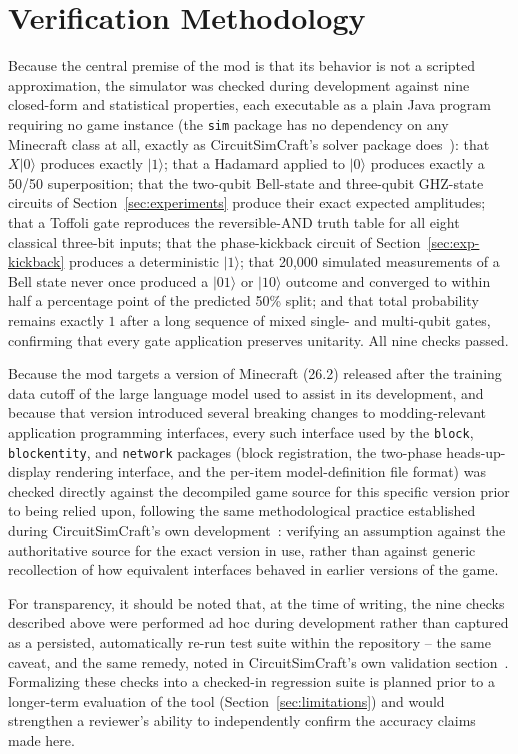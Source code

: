 \section{Verification Methodology}
\label{sec:validation}

Because the central premise of the mod is that its behavior is not a scripted
approximation, the simulator was checked during development against nine closed-form and
statistical properties, each executable as a plain Java program requiring no game instance
(the \texttt{sim} package has no dependency on any Minecraft class at all, exactly as
CircuitSimCraft's solver package does~\cite{picos2026circuitsimcraft}): that $X|0\rangle$ produces
exactly $|1\rangle$; that a Hadamard applied to $|0\rangle$ produces exactly a 50/50
superposition; that the two-qubit Bell-state and three-qubit GHZ-state circuits of
Section~\ref{sec:experiments} produce their exact expected amplitudes; that a Toffoli gate
reproduces the reversible-AND truth table for all eight classical three-bit inputs; that the
phase-kickback circuit of Section~\ref{sec:exp-kickback} produces a deterministic $|1\rangle$;
that 20{,}000 simulated measurements of a Bell state never once produced a $|01\rangle$ or
$|10\rangle$ outcome and converged to within half a percentage point of the predicted 50\%
split; and that total probability remains exactly $1$ after a long sequence of mixed single-
and multi-qubit gates, confirming that every gate application preserves unitarity. All nine
checks passed.

Because the mod targets a version of Minecraft (26.2) released after the training data
cutoff of the large language model used to assist in its development, and because that
version introduced several breaking changes to modding-relevant application programming
interfaces, every such interface used by the \texttt{block}, \texttt{blockentity}, and
\texttt{network} packages (block registration, the two-phase heads-up-display rendering
interface, and the per-item model-definition file format) was checked directly against the
decompiled game source for this specific version prior to being relied upon, following the
same methodological practice established during CircuitSimCraft's own
development~\cite{picos2026circuitsimcraft}: verifying an assumption against the authoritative
source for the exact version in use, rather than against generic recollection of how
equivalent interfaces behaved in earlier versions of the game.

For transparency, it should be noted that, at the time of writing, the nine checks described
above were performed ad hoc during development rather than captured as a persisted,
automatically re-run test suite within the repository -- the same caveat, and the same
remedy, noted in CircuitSimCraft's own validation section~\cite{picos2026circuitsimcraft}.
Formalizing these checks into a checked-in regression suite is planned prior to a longer-term
evaluation of the tool (Section~\ref{sec:limitations}) and would strengthen a reviewer's
ability to independently confirm the accuracy claims made here.
